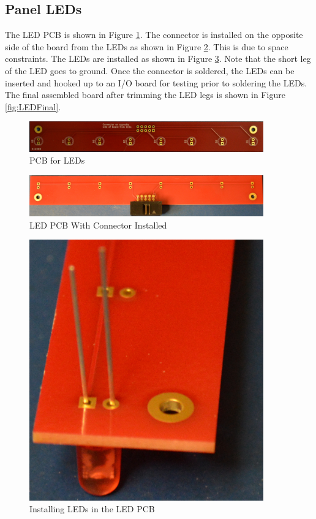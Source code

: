 \documentclass[10pt, openany]{book}
\begin{document}
\clearpage
\subsection{Panel LEDs}
\label{subsec:PanelLED}
The LED PCB is shown in Figure \ref{fig:LEDPCB}.  The connector is installed on the opposite side of the board from the LEDs as shown in Figure \ref{fig:LEDConnector}.  This is due to space constraints.  The LEDs are installed as shown in Figure \ref{fig:LEDLED}.  Note that the short leg of the LED goes to ground.  Once the connector is soldered, the LEDs can be inserted and hooked up to an I/O board for testing prior to soldering the LEDs.  The final assembled board after trimming the LED legs is shown in Figure \ref{fig:LEDFinal}.

\begin{figure}[ht!]
  \centering
  \includegraphics[width=0.9\textwidth]{../Pict/LED-Board.jpg}
  \caption{PCB for LEDs}
  \label{fig:LEDPCB}
\end{figure}

\begin{figure}[ht!]
  \centering
  \includegraphics[width=0.9\textwidth]{../Pict/LED-Connector.jpg}
  \caption{LED PCB With Connector Installed}
  \label{fig:LEDConnector}
\end{figure}

\begin{figure}[ht!]
  \centering
  \includegraphics[width=0.9\textwidth]{../Pict/LED-LED.jpg}
  \caption{Installing LEDs in the LED PCB}
  \label{fig:LEDLED}
\end{figure}
\end{document}
